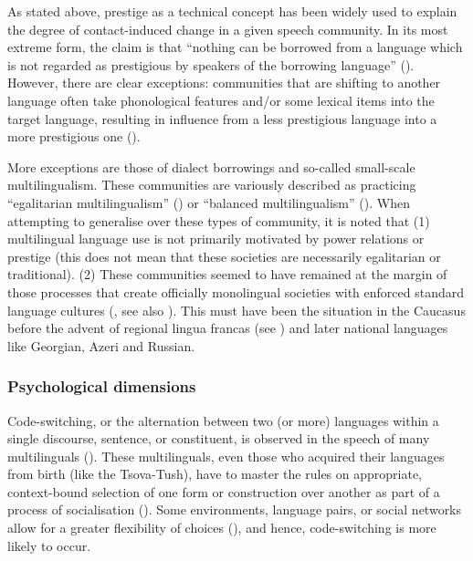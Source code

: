 As stated above, prestige as a technical concept has been widely used to explain the degree of contact-induced change in a given speech community. In its most extreme form, the claim is that ``nothing can be borrowed from a language which is not regarded as prestigious by speakers of the borrowing language'' (\cite{moravcsik1975verbborrow}). However, there are clear exceptions: communities that are shifting to another language often take phonological features and/or some lexical items into the target language, resulting in influence from a less prestigious language into a more prestigious one (\cite[37]{thomasonkaufman1988}).

More exceptions are those of dialect borrowings and so-called small-scale multilingualism. These communities are variously described as practicing ``egalitarian multilingualism'' (\cite{francois2012egalitarianmulti}) or ``balanced multilingualism'' (\cite{aikhenvald2006contactintro}). When attempting to generalise over these types of community, it is noted that (1) multilingual language use is not primarily motivated by power relations or prestige (this does not mean that these societies are necessarily egalitarian or traditional). (2) These communities seemed to have  remained at the margin of those processes that create officially monolingual societies with enforced standard language cultures (\cite[46--47]{luepke2016smallscale}, see also \cite{pakendorfetal2021smallscale}). This must have been the situation in the Caucasus before the advent of regional lingua francas (see \cite{daniel2021franca}) and later national languages like Georgian, Azeri and Russian.

\subsubsection{Psychological dimensions}


Code-switching, or the alternation between two (or more) languages within a single discourse, sentence, or constituent, is observed in the speech of many multilinguals (\cite[583]{poplack1980codeswitch}). These multilinguals, even those who acquired their languages from birth (like the Tsova-Tush), have to master the rules on appropriate, context-bound selection of one form or construction over another as part of a process of socialisation (\cite{lanza1997infantmixing}). Some environments, language pairs, or social networks allow for a greater flexibility of choices (\cite{grosjean2001bilingualmode,grosjean2008bilinguals}), and hence, code-switching is more likely to occur.

